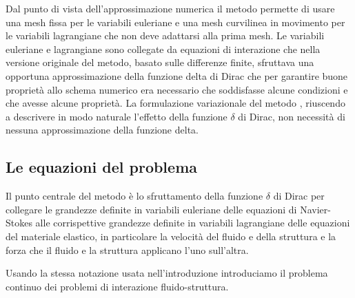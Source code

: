 Dal punto di vista dell'approssimazione numerica il metodo \IB permette di usare una mesh fissa per le variabili euleriane e una mesh curvilinea in movimento per le variabili lagrangiane che non deve adattarsi alla prima mesh. Le variabili euleriane e lagrangiane sono collegate da equazioni di interazione che nella versione originale del metodo, basato sulle differenze finite, sfruttava una opportuna approssimazione della funzione delta di Dirac che per garantire buone proprietà allo schema numerico era necessario che soddisfasse alcune condizioni e che avesse alcune proprietà. La formulazione variazionale del metodo \IB, riuscendo a descrivere in modo naturale l'effetto della funzione $\delta$ di Dirac, non necessità di nessuna approssimazione della funzione delta.

\subsection{Le equazioni del problema}

Il punto centrale del metodo è lo sfruttamento della funzione $\delta$ di Dirac per collegare le grandezze definite in variabili euleriane delle equazioni di Navier-Stokes alle corrispettive grandezze definite in variabili lagrangiane delle equazioni del materiale elastico, in particolare la velocità del fluido e della struttura e la forza che il fluido e la struttura applicano l'uno sull'altra.

Usando la stessa notazione usata nell'introduzione introduciamo il problema continuo dei problemi di interazione fluido-struttura.

